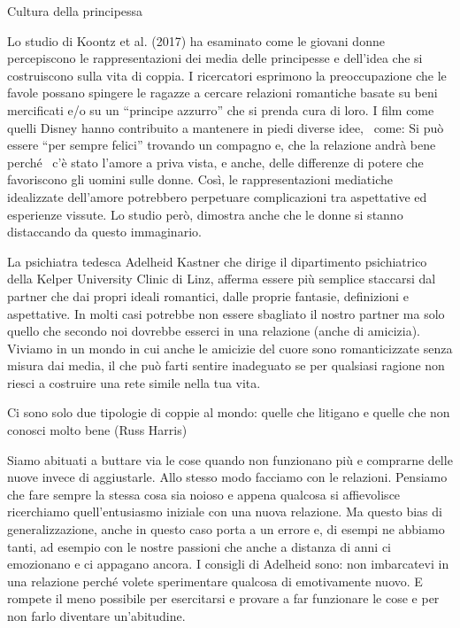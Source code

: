 \documentclass[12pt]{book} %
\begin{document}
\begin{mdframed}[linewidth=1pt]
Cultura della principessa

Lo studio di Koontz et al. (2017) ha esaminato
come le giovani donne percepiscono le rappresentazioni dei media delle principesse e dell'idea che
si costruiscono sulla vita di coppia. I ricercatori esprimono la preoccupazione che le favole possano spingere le
ragazze a cercare relazioni romantiche basate su beni mercificati e/o su un “principe azzurro” che si prenda cura di
loro. I film come quelli Disney hanno contribuito a mantenere in piedi diverse idee, \ come: Si può essere “per sempre
felici” trovando un compagno e, che la relazione andrà bene perché \ c'è stato
l'amore a priva vista, e anche, delle differenze di potere che favoriscono gli uomini sulle donne.
Così, le rappresentazioni mediatiche idealizzate dell'amore potrebbero perpetuare complicazioni
tra aspettative ed esperienze vissute. Lo studio però, dimostra anche che le donne si stanno distaccando da questo
immaginario.
\end{mdframed}

\bigskip

La psichiatra tedesca Adelheid Kastner che dirige il dipartimento psichiatrico della Kelper University Clinic di Linz,
afferma essere più semplice staccarsi dal partner che dai propri ideali romantici, dalle proprie fantasie, definizioni
e aspettative. In molti casi potrebbe non essere sbagliato il nostro partner ma solo quello che secondo noi dovrebbe
esserci in una relazione (anche di amicizia). Viviamo in un mondo in cui anche le
amicizie del cuore sono romanticizzate senza misura dai media, il che può farti sentire inadeguato se per qualsiasi
ragione non riesci a costruire una rete simile nella tua vita. 

\bigskip

Ci sono solo due tipologie di coppie al mondo: quelle che litigano e quelle che non conosci molto bene (Russ Harris)

\bigskip

Siamo abituati a buttare via le cose quando non funzionano più e comprarne delle nuove invece di aggiustarle. Allo
stesso modo facciamo con le relazioni. Pensiamo che fare sempre la stessa cosa sia noioso e appena qualcosa si
affievolisce ricerchiamo quell'entusiasmo iniziale con una nuova relazione. Ma questo bias di
generalizzazione, anche in questo caso porta a un errore e, di esempi ne abbiamo tanti, ad esempio con le nostre
passioni che anche a distanza di anni ci emozionano e ci appagano ancora. I consigli di Adelheid sono: non imbarcatevi
in una relazione perché volete sperimentare qualcosa di emotivamente nuovo. E rompete il meno possibile per esercitarsi
e provare a far funzionare le cose e per non farlo diventare
un'abitudine.
\end{document}
